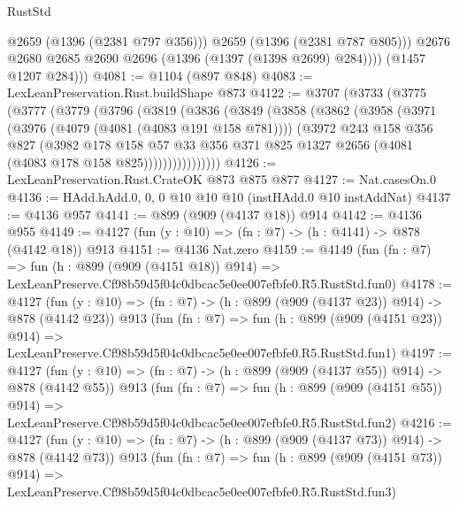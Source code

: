 \begin{lexlean}{RustStd}
\begin{coremodule}
                @2659
                (@1396 (@2381 @797 @356)))
              @2659
              (@1396 (@2381 @787 @805)))
            @2676
            @2680
            @2685
            @2690
            @2696
            (@1396 (@1397 (@1398 @2699) @284))))
        (@1457 @1207 @284)))
@4081 := @1104 (@897 @848)
@4083 := LexLeanPreservation.Rust.buildShape @873
@4122 := @3707
    (@3733
      (@3775
        (@3777
          (@3779
            (@3796
              (@3819
                (@3836
                  (@3849
                    (@3858
                      (@3862
                        (@3958
                          (@3971
                            (@3976 (@4079 (@4081 (@4083 @191 @158 @781))))
                            (@3972
                              @243
                              @158
                              @356
                              @827
                              (@3982
                                @178
                                @158
                                @57
                                @33
                                @356
                                @371
                                @825
                                @1327
                                @2656
                                (@4081 (@4083 @178 @158 @825))))))))))))))))
@4126 := LexLeanPreservation.Rust.CrateOK @873 @875 @877
@4127 := Nat.casesOn.{0}
@4136 := HAdd.hAdd.{0, 0, 0} @10 @10 @10 (instHAdd.{0} @10 instAddNat)
@4137 := @4136 @957
@4141 := @899 (@909 (@4137 @18)) @914
@4142 := @4136 @955
@4149 := @4127 (fun (y : @10) => (fn : @7) -> (h : @4141) -> @878 (@4142 @18)) @913
@4151 := @4136 Nat.zero
@4159 := @4149
    (fun (fn : @7) =>
    fun (h : @899 (@909 (@4151 @18)) @914) =>
    LexLeanPreserve.Cf98b59d5f04c0dbcac5e0ee007efbfe0.R5.RustStd.fun0)
@4178 := @4127
    (fun (y : @10) => (fn : @7) -> (h : @899 (@909 (@4137 @23)) @914) -> @878 (@4142 @23))
    @913
    (fun (fn : @7) =>
    fun (h : @899 (@909 (@4151 @23)) @914) =>
    LexLeanPreserve.Cf98b59d5f04c0dbcac5e0ee007efbfe0.R5.RustStd.fun1)
@4197 := @4127
    (fun (y : @10) => (fn : @7) -> (h : @899 (@909 (@4137 @55)) @914) -> @878 (@4142 @55))
    @913
    (fun (fn : @7) =>
    fun (h : @899 (@909 (@4151 @55)) @914) =>
    LexLeanPreserve.Cf98b59d5f04c0dbcac5e0ee007efbfe0.R5.RustStd.fun2)
@4216 := @4127
    (fun (y : @10) => (fn : @7) -> (h : @899 (@909 (@4137 @73)) @914) -> @878 (@4142 @73))
    @913
    (fun (fn : @7) =>
    fun (h : @899 (@909 (@4151 @73)) @914) =>
    LexLeanPreserve.Cf98b59d5f04c0dbcac5e0ee007efbfe0.R5.RustStd.fun3)

\end{coremodule}
\end{lexlean}
